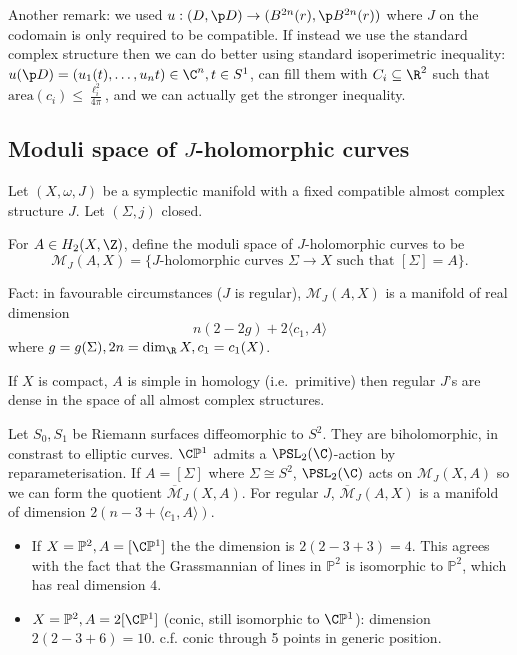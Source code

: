 \documentclass[a4paper]{article}
\renewcommand*{\P}{\mathbb{P}}
\begin{document}
Another remark: we used \(u: (D, \p D) \to (B^{2n}(r), \p B^{2n}(r))\) where \(J\) on the codomain is only required to be compatible. If instead we use the standard complex structure then we can do better using standard isoperimetric inequality: \(u(\p D) = (u_1(t), \dots, u_nt) \in \C^n, t \in S^1\), can fill them with \(C_i \subseteq \R^2\) such that \(\mathrm{area}(c_i) \leq \frac{\ell_i^2}{4\pi}\), and we can actually get the stronger inequality.

\subsection{Moduli space of \(J\)-holomorphic curves}

Let \((X, \omega, J)\) be a symplectic manifold with a fixed compatible almost complex structure \(J\). Let \((\Sigma, j)\) closed.

\begin{definition}
  For \(A \in H_2(X, \Z)\), define the moduli space of \(J\)-holomorphic curves to be
  \[
    \mathcal M_J(A, X) = \{J\text{-holomorphic curves } \Sigma \to X \text{ such that } [\Sigma] = A\}.
  \]
\end{definition}

Fact: in favourable circumstances (\(J\) is regular), \(\mathcal M_J(A, X)\) is a manifold of real dimension
\[
  n(2 - 2g) + 2\langle c_1, A\rangle
\]
where \(g = g(\Sigma), 2n = \dim_\R X, c_1 = c_1(X)\).

\begin{theorem}
  If \(X\) is compact, \(A\) is simple in homology (i.e.\ primitive) then regular \(J\)'s are dense in the space of all almost complex structures.
\end{theorem}

Let \(S_0, S_1\) be Riemann surfaces diffeomorphic to \(S^2\). They are biholomorphic, in constrast to elliptic curves. \(\C\P^1\) admits a \(\PSL_2(\C)\)-action by reparameterisation. If \(A = [\Sigma]\) where \(\Sigma \cong S^2\), \(\PSL_2(\C)\) acts on \(\mathcal M_J(X, A)\) so we can form the quotient \(\overline{\mathcal M}_J(X, A)\). For regular \(J\), \(\overline {\mathcal M}_J(A, X)\) is a manifold of dimension \(2(n - 3 + \langle c_1, A\rangle)\).

\begin{itemize}
\item If \(X = \P^2, A = [\C\P^1]\) the the dimension is \(2 (2 - 3 + 3) = 4\). This agrees with the fact that the Grassmannian of lines in \(\P^2\) is isomorphic to \(\P^2\), which has real dimension \(4\).
\item \(X = \P^2, A = 2[\C\P^1]\) (conic, still isomorphic to \(\C\P^1\)): dimension \(2(2 - 3 + 6) = 10\). c.f. conic through 5 points in generic position.
\end{itemize}
\end{document}
